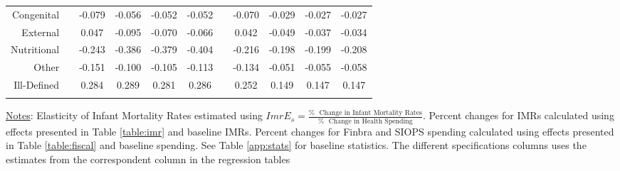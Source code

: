 \begin{table}[h!]
\begin{footnotesize}
\begin{center}
{\begin{threeparttable}[b]
\begin{tabular}{rrrrrrrrrrr}
    \multicolumn{1}{p{15.145em}}{Congenital} &       & \multicolumn{1}{c}{-0.079} & \multicolumn{1}{c}{-0.056} & \multicolumn{1}{c}{-0.052} & \multicolumn{1}{c}{-0.052} &       & \multicolumn{1}{c}{-0.070} & \multicolumn{1}{c}{-0.029} & \multicolumn{1}{c}{-0.027} & \multicolumn{1}{c}{-0.027} \\
    \multicolumn{1}{p{15.145em}}{External} &       & \multicolumn{1}{c}{0.047} & \multicolumn{1}{c}{-0.095} & \multicolumn{1}{c}{-0.070} & \multicolumn{1}{c}{-0.066} &       & \multicolumn{1}{c}{0.042} & \multicolumn{1}{c}{-0.049} & \multicolumn{1}{c}{-0.037} & \multicolumn{1}{c}{-0.034} \\
    \multicolumn{1}{p{15.145em}}{Nutritional} &       & \multicolumn{1}{c}{-0.243} & \multicolumn{1}{c}{-0.386} & \multicolumn{1}{c}{-0.379} & \multicolumn{1}{c}{-0.404} &       & \multicolumn{1}{c}{-0.216} & \multicolumn{1}{c}{-0.198} & \multicolumn{1}{c}{-0.199} & \multicolumn{1}{c}{-0.208} \\
    \multicolumn{1}{p{15.145em}}{Other} &       & \multicolumn{1}{c}{-0.151} & \multicolumn{1}{c}{-0.100} & \multicolumn{1}{c}{-0.105} & \multicolumn{1}{c}{-0.113} &       & \multicolumn{1}{c}{-0.134} & \multicolumn{1}{c}{-0.051} & \multicolumn{1}{c}{-0.055} & \multicolumn{1}{c}{-0.058} \\
    \multicolumn{1}{p{15.145em}}{Ill-Defined} &       & \multicolumn{1}{c}{0.284} & \multicolumn{1}{c}{0.289} & \multicolumn{1}{c}{0.281} & \multicolumn{1}{c}{0.286} &       & \multicolumn{1}{c}{0.252} & \multicolumn{1}{c}{0.149} & \multicolumn{1}{c}{0.147} & \multicolumn{1}{c}{0.147} \\
          &       &       &       &       &       &       &       &       &       &  \\
    \bottomrule
    \bottomrule
    \end{tabular}%
    
    
        \begin{tablenotes}
  \scriptsize{\underline{Notes}: Elasticity of Infant Mortality Rates estimated using $ImrE_s = \frac{\% \, \, \textrm{ Change in Infant Mortality Rates}}{\% \, \, \textrm{ Change in Health Spending}}$. Percent changes for IMRs calculated using effects presented in Table \ref{table:imr} and baseline IMRs. Percent changes for Finbra and SIOPS spending calculated using effects presented in Table \ref{table:fiscal} and baseline spending. See Table \ref{app:stats} for baseline statistics. The different specifications columns uses the estimates from the correspondent column in the regression tables}
  \end{tablenotes}
    
  \label{table:elasticity}%

\end{threeparttable}
}
\end{center}
\end{footnotesize}
\end{table}
